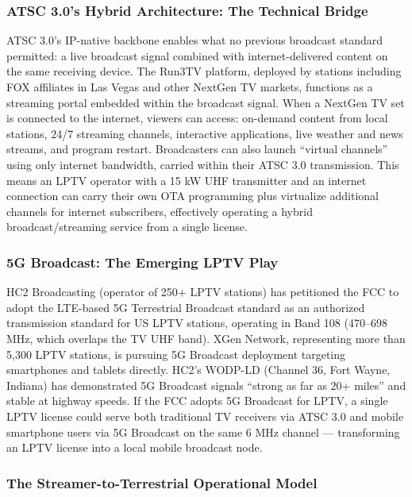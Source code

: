 \documentclass[11pt,letterpaper]{article}
\begin{document}
\subsubsection{ATSC 3.0's Hybrid Architecture: The Technical Bridge}

ATSC 3.0's IP-native backbone enables what no previous broadcast standard permitted: a live broadcast signal combined with internet-delivered content on the same receiving device. The Run3TV platform, deployed by stations including FOX affiliates in Las Vegas and other NextGen TV markets, functions as a streaming portal embedded within the broadcast signal. When a NextGen TV set is connected to the internet, viewers can access: on-demand content from local stations, 24/7 streaming channels, interactive applications, live weather and news streams, and program restart. Broadcasters can also launch ``virtual channels'' using only internet bandwidth, carried within their ATSC 3.0 transmission. This means an LPTV operator with a 15 kW UHF transmitter and an internet connection can carry their own OTA programming plus virtualize additional channels for internet subscribers, effectively operating a hybrid broadcast/streaming service from a single license.

\subsubsection{5G Broadcast: The Emerging LPTV Play}

HC2 Broadcasting (operator of 250+ LPTV stations) has petitioned the FCC to adopt the LTE-based 5G Terrestrial Broadcast standard as an authorized transmission standard for US LPTV stations, operating in Band 108 (470--698 MHz, which overlaps the TV UHF band). XGen Network, representing more than 5,300 LPTV stations, is pursuing 5G Broadcast deployment targeting smartphones and tablets directly. HC2's WODP-LD (Channel 36, Fort Wayne, Indiana) has demonstrated 5G Broadcast signals ``strong as far as 20+ miles'' and stable at highway speeds. If the FCC adopts 5G Broadcast for LPTV, a single LPTV license could serve both traditional TV receivers via ATSC 3.0 and mobile smartphone users via 5G Broadcast on the same 6 MHz channel --- transforming an LPTV license into a local mobile broadcast node.

\subsubsection{The Streamer-to-Terrestrial Operational Model}
\end{document}
